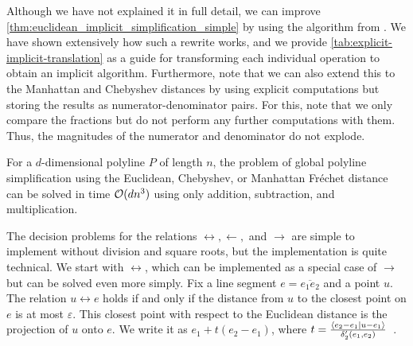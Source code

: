 Although we have not explained it in full detail, we can improve \cref{thm:euclidean_implicit_simplification_simple} by using the algorithm from \citeauthor{polyline_simplification_has_cubic_complexity_bringmannetal}. We have shown extensively how such a rewrite works, and we provide \cref{tab:explicit-implicit-translation} as a guide for transforming each individual operation to obtain an implicit algorithm.
Furthermore, note that we can also extend this to the Manhattan and Chebyshev distances by using explicit computations but storing the results as numerator-denominator pairs. For this, note that we only compare the fractions but do not perform any further computations with them. Thus, the magnitudes of the numerator and denominator do not explode.

\begin{theorem}\label{thm:euclidean_implicit_simplification_advanced}
  For a \(d\)-dimensional polyline \(P\) of length \(n\), the problem of global polyline simplification using the Euclidean, Chebyshev, or Manhattan Fréchet distance can be solved in time \(\mathcal{O}(d n^3)\) using only addition, subtraction, and multiplication.
\end{theorem}

The decision problems for the relations \(\leftrightarrow, \leftarrow,\) and \(\rightarrow\) are simple to implement without division and square roots, but the implementation is quite technical. We start with \(\leftrightarrow\), which can be implemented as a special case of \(\rightarrow\) but can be solved even more simply. Fix a line segment \(e = \overline{e_1e_2}\) and a point \(u\). The relation \(u \leftrightarrow e\) holds if and only if the distance from \(u\) to the closest point on \(e\) is at most \(\varepsilon\). This closest point with respect to the Euclidean distance is the projection of \(u\) onto \(e\). We write it as \(e_1 + t(e_2 - e_1)\), where \(t = \frac{\braket{e_2 - e_1 | u - e_1}}{\delta_2'(e_1, e_2)}\)~\cite{linear_algebra}.

